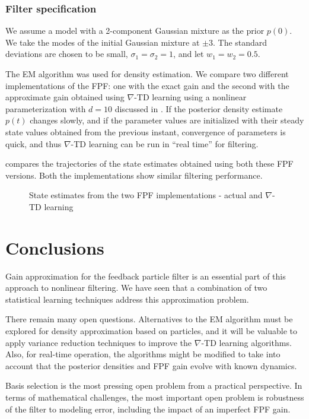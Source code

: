 \subsubsection*{Filter specification}  We assume a model with a 2-component Gaussian mixture as the prior $p(0)$. We take the modes of the initial Gaussian mixture at $\pm 3$. The standard deviations are chosen to be small, $\sigma_{1}=\sigma_{2}=1$, and let $w_{1}=w_{2}=0.5$.

The EM algorithm was used for density estimation. We compare two different implementations of the FPF: one with the exact gain and the second with the approximate gain obtained using $\nabla$-TD learning using a nonlinear parameterization with $d=10$ discussed in . If the posterior density estimate $p(t)$ changes slowly, and if the parameter values are initialized with their steady state values obtained from the previous instant, convergence of parameters is quick, and thus $\nabla$-TD learning can be run in ``real time'' for filtering.

 compares the trajectories of the state estimates obtained using both these FPF versions. Both the implementations show similar filtering performance.

\begin{figure}
	\begin{center}
		\caption{ State estimates from the two FPF implementations - actual and $\nabla$-TD learning }
		\label{Chap4_Fig_FPF_EM_TD}
	\end{center}
\end{figure}


\section{Conclusions}
\label{section_conclusions}

Gain approximation for the feedback particle filter is an essential part of this approach to nonlinear filtering.  We have seen that a combination of two statistical learning techniques address this approximation problem.

There remain many open questions.   Alternatives to the EM algorithm must be explored for density approximation based on particles,  and it will be valuable to apply variance reduction techniques to improve the $\nabla$-TD learning algorithms.  Also, for real-time operation, the algorithms might be modified to take into account that the posterior densities and FPF gain evolve with known dynamics.  

Basis selection is the most pressing open problem from a practical perspective.  In terms of mathematical challenges, the most important open problem is robustness of the filter to modeling error, including the impact of an imperfect FPF gain.

